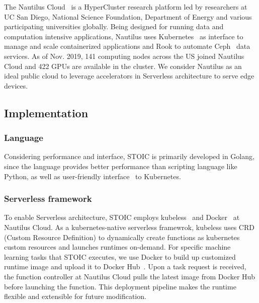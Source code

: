  The Nautilus Cloud~\cite{ref:nautilus} is a HyperCluster research platform led by researchers at UC San Diego, National Science Foundation, Department of Energy and various participating universities globally. Being designed for running data and computation intensive applications, Nautilus uses Kubernetes~\cite{ref:k8s} as interface to manage and scale containerized applications and Rook to automate Ceph~\cite{ref:ceph} data services. As of Nov. 2019, 141 computing nodes across the US joined Nautilus Cloud and 422 GPUs are available in the cluster. We consider Nautilus as an ideal public cloud to leverage accelerators in Serverless architecture to serve edge devices. 
 
 \subsection{Implementation}
 
 \subsubsection{Language}
 Considering performance and interface, STOIC is primarily developed in Golang, since the language provides better performance than scripting language like Python, as well as user-friendly interface~\cite{ref:client-go} to Kubernetes. 
 
 \BlankLine
 \subsubsection{Serverless framework}
 To enable Serverless architecture, STOIC employs kubeless~\cite{ref:kubeless} and Docker~\cite{ref:docker} at Nautilus Cloud. As a kubernetes-native serverless framewrok, kubeless uses CRD (Custom Resource Definition)\cite{ref:crd} to dynamically create functions as kubernetes custom resources and launches runtimes on-demand. For specific machine learning tasks that STOIC executes, we use Docker to build up customized runtime image and upload it to Docker Hub~\cite{ref:dockerhub}. Upon a task request is received, the function controller at Nautilus Cloud pulls the latest image from Docker Hub before launching the function. This deployment pipeline makes the runtime flexible and extensible for future modification. 
 
 \BlankLine
